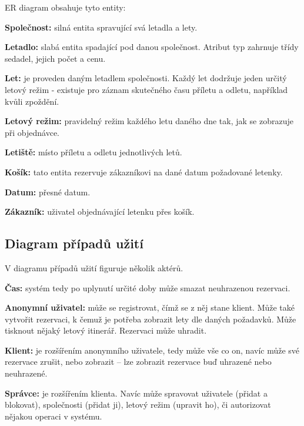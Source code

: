 \documentclass[11pt,a4paper,landscape]{article}
\begin{document}
\begin{multicols*}{2}
            ER diagram obsahuje tyto entity:

            \textbf{Společnost:} silná entita spravující svá letadla a lety.

            \textbf{Letadlo:} slabá entita spadající pod danou společnost. Atribut typ zahrnuje třídy sedadel, jejich počet a cenu.

            \textbf{Let:} je proveden daným letadlem společnosti. Každý let dodržuje jeden určitý letový režim - existuje pro záznam skutečného času příletu a odletu, například kvůli zpoždění.

            \textbf{Letový režim:} pravidelný režim každého letu daného dne tak, jak se zobrazuje při objednávce.
            
            \textbf{Letiště:} místo příletu a odletu jednotlivých letů.
            
            \textbf{Košík:} tato entita rezervuje zákazníkovi na dané datum požadované letenky.
            
            \textbf{Datum:} přesné datum.

            \textbf{Zákazník:} uživatel objednávající letenku přes košík.
            
             
        \subsection{Diagram případů užití}
            
            V diagramu případů užití figuruje několik aktérů.
            
            \textbf{Čas:} systém tedy po uplynutí určité doby může smazat neuhrazenou rezervaci.
            
            \textbf{Anonymní uživatel:} může se registrovat, čímž se z něj stane klient. Může také vytvořit rezervaci, k čemuž je potřeba zobrazit lety dle daných požadavků. Může tisknout nějaký letový itinerář. Rezervaci může uhradit.
            
            \textbf{Klient:} je rozšířením anonymního uživatele, tedy může vše co on, navíc může své rezervace zrušit, nebo zobrazit – lze zobrazit rezervace buď uhrazené nebo neuhrazené.
            
            \textbf{Správce:} je rozšířením klienta. Navíc může spravovat uživatele (přidat a blokovat), společnosti (přidat ji), letový režim (upravit ho), či autorizovat nějakou operaci v systému.
            
\end{multicols*}
\end{document}
